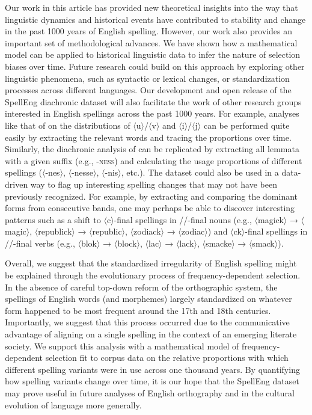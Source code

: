 \documentclass[doc,biblatex]{apa7}
\newcommand\spelling[1]{\allowbreak$\langle$#1$\rangle$}
\newcommand\pronunciation[1]{/\textdoulos{#1}/}
\begin{document}
Our work in this article has provided new theoretical insights into the way that linguistic dynamics and historical events have contributed to stability and change in the past 1000 years of English spelling. However, our work also provides an important set of methodological advances. We have shown how a mathematical model can be applied to historical linguistic data to infer the nature of selection biases over time. Future research could build on this approach by exploring other linguistic phenomena, such as syntactic or lexical changes, or standardization processes across different languages. Our development and open release of the SpellEng diachronic dataset will also facilitate the work of other research groups interested in English spellings across the past 1000 years. For example, analyses like that of \textcite{CondorelliUVIJ:2021} on the distributions of \spelling{u}/\spelling{v} and \spelling{i}/\spelling{j} can be performed quite easily by extracting the relevant words and tracing the proportions over time. Similarly, the diachronic analysis of \textcite{Berg:2017} can be replicated by extracting all lemmata with a given suffix (e.g., \textsc{-ness}) and calculating the usage proportions of different spellings (\spelling{-nes}, \spelling{-nesse}, \spelling{-nis}, etc.). The dataset could also be used in a data-driven way to flag up interesting spelling changes that may not have been previously recognized. For example, by extracting and comparing the dominant forms from consecutive bands, one may perhaps be able to discover interesting patterns such as a shift to \spelling{c}-final spellings in \pronunciation{k}-final nouns (e.g., \spelling{magick} → \spelling{magic}, \spelling{republick} → \spelling{republic}, \spelling{zodiack} → \spelling{zodiac}) and \spelling{ck}-final spellings in \pronunciation{k}-final verbs (e.g., \spelling{blok} → \spelling{block}, \spelling{lac} → \spelling{lack}, \spelling{smacke} → \spelling{smack}).

Overall, we suggest that the standardized irregularity of English spelling might be explained through the evolutionary process of frequency-dependent selection. In the absence of careful top-down reform of the orthographic system, the spellings of English words (and morphemes) largely standardized on whatever form happened to be most frequent around the 17th and 18th centuries. Importantly, we suggest that this process occurred due to the communicative advantage of aligning on a single spelling in the context of an emerging literate society. We support this analysis with a mathematical model of frequency-dependent selection fit to corpus data on the relative proportions with which different spelling variants were in use across one thousand years. By quantifying how spelling variants change over time, it is our hope that the SpellEng dataset may prove useful in future analyses of English orthography and in the cultural evolution of language more generally.
\end{document}
